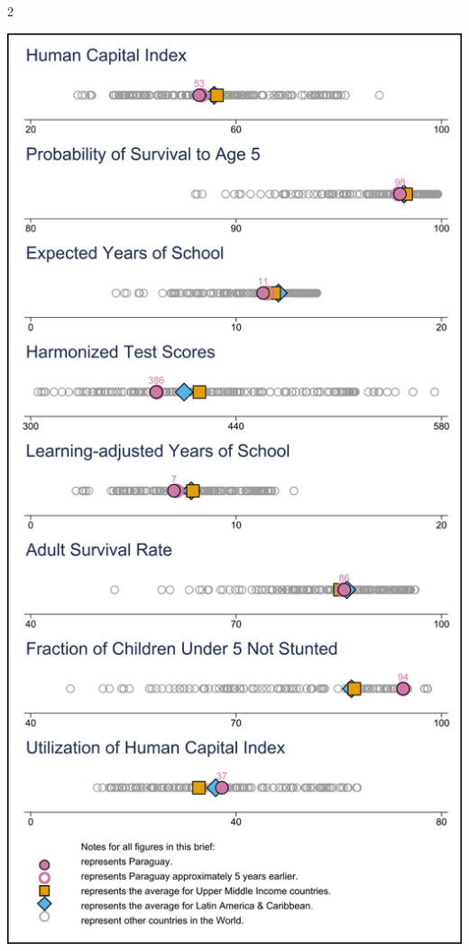 \documentclass[
  9pt,
]{article}
\begin{document}
\begin {multicols}{2}
\begin{flushright}\includegraphics[height=0.9\textheight]{Graphs/p1_PRY_all} \end{flushright}

\vfill

\end {multicols}
\end{document}
